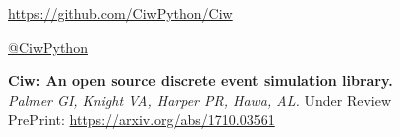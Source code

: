 \documentclass{beamer}
\begin{document}
\begin{frame}

\begin{center}
\textcolor{orange}{\url{https://github.com/CiwPython/Ciw}}
\end{center}

\vspace{8mm}

\begin{center}
\Large{\textcolor{darkorange}{\href{https://twitter.com/CiwPython}{@CiwPython}}}
\end{center}

\vspace{8mm}

\textbf{Ciw: An open source discrete event simulation library.}\\
\textit{Palmer GI, Knight VA, Harper PR, Hawa, AL.}
Under Review\\
PrePrint: \textcolor{darkorange}{\url{https://arxiv.org/abs/1710.03561}}
\end{frame}
\end{document}
